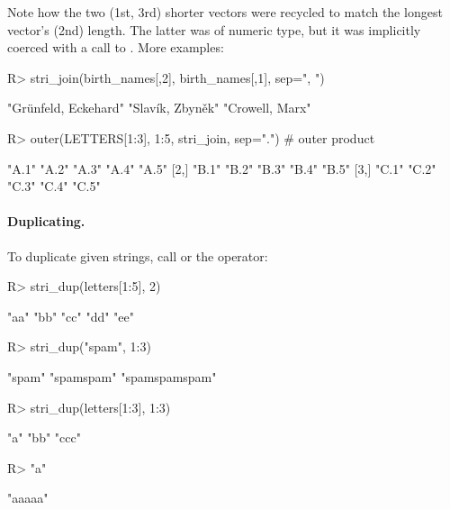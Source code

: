 \documentclass[nojss]{jss}
\begin{document}
\noindent
Note how the two (1st, 3rd) shorter vectors were {recycled} to match
the longest vector's (2nd) length. The latter was of numeric type,
but it was implicitly coerced with  a call to .
More examples:

\begin{Schunk}
\begin{Sinput}
R> stri_join(birth_names[,2], birth_names[,1], sep=", ")
\end{Sinput}
\begin{Soutput}
[1] "Grünfeld, Eckehard" "Slavík, Zbyněk"     "Crowell, Marx"
\end{Soutput}
\begin{Sinput}
R> outer(LETTERS[1:3], 1:5, stri_join, sep=".") # outer product
\end{Sinput}
\begin{Soutput}
     [,1]  [,2]  [,3]  [,4]  [,5]
[1,] "A.1" "A.2" "A.3" "A.4" "A.5"
[2,] "B.1" "B.2" "B.3" "B.4" "B.5"
[3,] "C.1" "C.2" "C.3" "C.4" "C.5"
\end{Soutput}
\end{Schunk}


\paragraph{Duplicating.}
To duplicate given strings, call
 or the  operator:


\begin{Schunk}
\begin{Sinput}
R> stri_dup(letters[1:5], 2)
\end{Sinput}
\begin{Soutput}
[1] "aa" "bb" "cc" "dd" "ee"
\end{Soutput}
\begin{Sinput}
R> stri_dup("spam", 1:3)
\end{Sinput}
\begin{Soutput}
[1] "spam"         "spamspam"     "spamspamspam"
\end{Soutput}
\begin{Sinput}
R> stri_dup(letters[1:3], 1:3)
\end{Sinput}
\begin{Soutput}
[1] "a"   "bb"  "ccc"
\end{Soutput}
\begin{Sinput}
R> "a" %s*% 5
\end{Sinput}
\begin{Soutput}
[1] "aaaaa"
\end{Soutput}
\end{Schunk}
\end{document}

